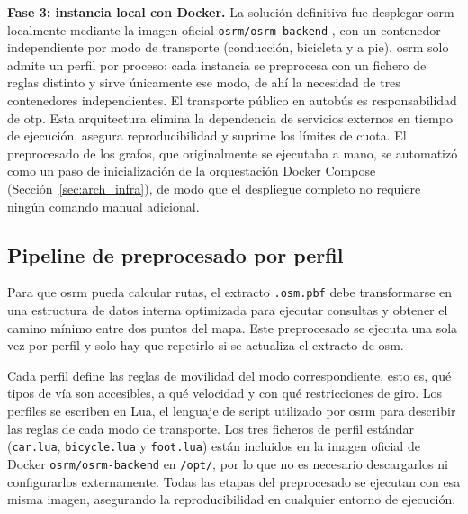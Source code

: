 \textbf{Fase 3: instancia local con Docker.} La solución definitiva fue desplegar \gls{osrm} localmente mediante la imagen oficial \texttt{osrm/osrm-backend} \cite{OSRMGitHub}, con un contenedor independiente por modo de transporte (conducción, bicicleta y a pie). \gls{osrm} solo admite un perfil por proceso: cada instancia se preprocesa con un fichero de reglas distinto y sirve únicamente ese modo, de ahí la necesidad de tres contenedores independientes. El transporte público en autobús es responsabilidad de \gls{otp}. Esta arquitectura elimina la dependencia de servicios externos en tiempo de ejecución, asegura reproducibilidad y suprime los límites de cuota. El preprocesado de los grafos, que originalmente se ejecutaba a mano, se automatizó como un paso de inicialización de la orquestación Docker Compose (Sección~\ref{sec:arch_infra}), de modo que el despliegue completo no requiere ningún comando manual adicional.



\subsection{Pipeline de preprocesado por perfil}
\label{subsec:impl_osrm_pipeline}

Para que \gls{osrm} pueda calcular rutas, el extracto \texttt{.osm.pbf} debe transformarse en una estructura de datos interna optimizada para ejecutar consultas y obtener el camino mínimo entre dos puntos del mapa. Este preprocesado se ejecuta una sola vez por perfil y solo hay que repetirlo si se actualiza el extracto de \gls{osm}.\newline


Cada perfil define las reglas de movilidad del modo correspondiente, esto es, qué tipos de vía son accesibles, a qué velocidad y con qué restricciones de giro. Los perfiles se escriben en Lua, el lenguaje de script utilizado por \gls{osrm} para describir las reglas de cada modo de transporte. Los tres ficheros de perfil estándar (\texttt{car.lua}, \texttt{bicycle.lua} y \texttt{foot.lua}) están incluidos en la imagen oficial de Docker \texttt{osrm/osrm-backend} en \texttt{/opt/}, por lo que no es necesario descargarlos ni configurarlos externamente. Todas las etapas del preprocesado se ejecutan con esa misma imagen, asegurando la reproducibilidad en cualquier entorno de ejecución.


